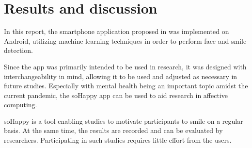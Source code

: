 \section{Results and discussion} \label{sec:results_and_discussion}

In this report, the smartphone application proposed in \cite{sohappy} was 
implemented on Android, utilizing machine learning techniques in order to 
perform face and smile detection.

Since the app was primarily intended to be used in research, it was designed
with interchangeability in mind, allowing it to be used and adjusted as 
necessary in future studies. Especially with mental health being an important
topic amidst the current pandemic, the soHappy app can be used to aid research 
in affective computing.

soHappy is a tool enabling studies to motivate participants to smile on a 
regular basis. At the same time, the results are recorded and can be evaluated 
by researchers. Participating in such studies requires little effort from the 
users.
